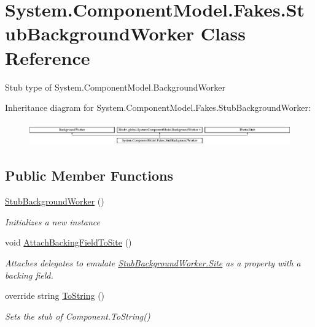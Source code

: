 \hypertarget{class_system_1_1_component_model_1_1_fakes_1_1_stub_background_worker}{\section{System.\-Component\-Model.\-Fakes.\-Stub\-Background\-Worker Class Reference}
\label{class_system_1_1_component_model_1_1_fakes_1_1_stub_background_worker}
}


Stub type of System.\-Component\-Model.\-Background\-Worker 


Inheritance diagram for System.\-Component\-Model.\-Fakes.\-Stub\-Background\-Worker\-:\begin{figure}[H]
\begin{center}
\leavevmode
\includegraphics[height=1.022831cm]{class_system_1_1_component_model_1_1_fakes_1_1_stub_background_worker}
\end{center}
\end{figure}
\subsection*{Public Member Functions}
\begin{DoxyCompactItemize}
\item 
\hyperlink{class_system_1_1_component_model_1_1_fakes_1_1_stub_background_worker_a969f18fc073c2add1b19103252e44c96}{Stub\-Background\-Worker} ()
\begin{DoxyCompactList}\small\item\em Initializes a new instance\end{DoxyCompactList}\item 
void \hyperlink{class_system_1_1_component_model_1_1_fakes_1_1_stub_background_worker_a58199d2acd0eb0110ca0b93120afda47}{Attach\-Backing\-Field\-To\-Site} ()
\begin{DoxyCompactList}\small\item\em Attaches delegates to emulate \hyperlink{class_system_1_1_component_model_1_1_fakes_1_1_stub_background_worker_ae7ab9329a9506b2a59587350073701fe}{Stub\-Background\-Worker.\-Site} as a property with a backing field.\end{DoxyCompactList}\item 
override string \hyperlink{class_system_1_1_component_model_1_1_fakes_1_1_stub_background_worker_ab49002d7e5a430dbabe845130874cd3c}{To\-String} ()
\begin{DoxyCompactList}\small\item\em Sets the stub of Component.\-To\-String()\end{DoxyCompactList}\end{DoxyCompactItemize}
